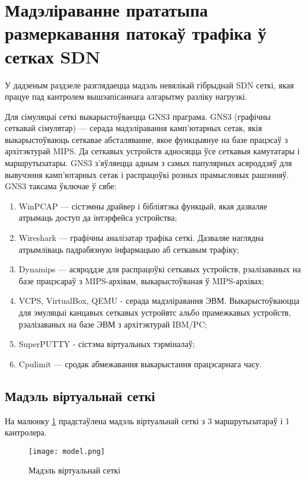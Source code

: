 \section{Мадэліраванне прататыпа размеркавання патокаў трафіка ў сетках SDN}

У дадзеным раздзеле разглядаецца мадэль невялікай гібрыднай SDN сеткі, якая працуе
пад кантролем вышэапісаннага алгарытму разліку нагрузкі.

Для сімуляцыі сеткі выкарыстоўваецца GNS3 праграма.
GNS3 (графічны сеткавай сімулятар) --- серада мадэліравання камп'ютарных сетак, якія выкарыстоўваюць сеткавае абсталяванне, якое функцыянуе на базе працэсаў з архітэктурай MIPS. Да сеткавых устройств адносяцца ўсе сеткавыя камутатары і маршрутызатары. GNS3 з'яўляецца адным з самых папулярных асяроддзяў для вывучэння камп'ютарных сетак і распрацоўкі розных прамысловых рашэнняў. GNS3 таксама ўключае ў сябе:
\begin{enumerate}
    \item WinPCAP --- сістэмны драйвер і бібліятэка функцый, якая дазваляе атрымаць доступ да інтэрфейса устройства;
    \item Wireshark --- графічны аналізатар трафіка сеткі. Дазваляе наглядна атрымліваць падрабязную інфармацыю аб сеткавым трафіку;
    \item Dynamips --- асяроддзе для распрацоўкі сеткавых устройств, рэалізаваных на базе працэсараў з MIPS-архівам, выкарыстоўваная ў MIPS-архівах;
    \item VCPS, VirtualBox, QEMU - серада мадэліравання ЭВМ. Выкарыстоўваюцца для эмуляцыі канцавых сеткавых устройвтс альбо прамежкавых устройств, рэалізаваных на базе ЭВМ з архітэктурай IBM/PC;
    \item SuperPUTTY - сістэма віртуальных тэрміналаў;
    \item Cpulimit --- сродак абмежавання выкарыстання працэсарнага часу.
\end{enumerate}

\subsection{Мадэль віртуальнай сеткі}

На малюнку \ref{img: model} прадстаўлена мадэль віртуальнай сеткі з 3 маршрутызатараў і 1 кантролера.

\begin{figure}[h!]
    \centering
    \texttt{[image: model.png]}
    \caption{Мадэль віртуальнай сеткі}
    \label{img: model} 
\end{figure}

